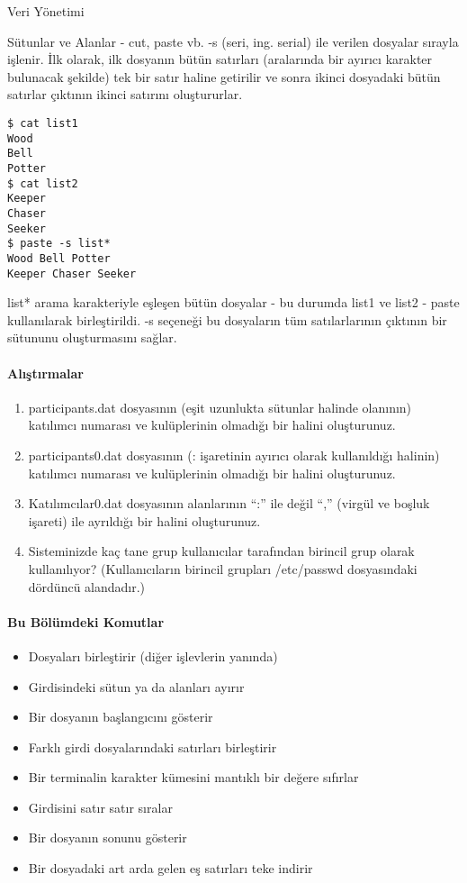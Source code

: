 \begin{section}{Veri Yönetimi}
\begin{subsection}{Sütunlar ve Alanlar - cut, paste vb.}
-s (seri, ing. serial) ile verilen dosyalar sırayla işlenir. İlk olarak, ilk dosyanın bütün satırları (aralarında bir ayırıcı karakter bulunacak şekilde) tek bir satır haline getirilir ve sonra ikinci dosyadaki bütün satırlar çıktının ikinci satırını oluştururlar.

\footnotesize
\begin{verbatim}
$ cat list1
Wood
Bell
Potter
$ cat list2
Keeper
Chaser
Seeker
$ paste -s list*
Wood Bell Potter
Keeper Chaser Seeker
\end{verbatim}
\normalsize

list* arama karakteriyle eşleşen bütün dosyalar - bu durumda list1 ve list2 - paste kullanılarak birleştirildi. -s seçeneği bu dosyaların tüm satılarlarının çıktının bir sütununu oluşturmasını sağlar.

\paragraph{{\Huge{\PencilLeftDown}}Alıştırmalar}{
\begin{enumerate}
 \item participants.dat dosyasının (eşit uzunlukta sütunlar halinde olanının) katılımcı numarası ve kulüplerinin olmadığı bir halini oluşturunuz.
 \item participants0.dat dosyasının (: işaretinin ayırıcı olarak kullanıldığı halinin) katılımcı numarası ve kulüplerinin olmadığı bir halini oluşturunuz.
 \item Katılımcılar0.dat dosyasının alanlarının “:” ile değil “,\textvisiblespace ” (virgül ve boşluk işareti) ile ayrıldığı bir halini oluşturunuz.
 \item Sisteminizde kaç tane grup kullanıcılar tarafından birincil grup olarak kullanılıyor? (Kullanıcıların birincil grupları /etc/passwd dosyasındaki dördüncü alandadır.)
\end{enumerate}}

\paragraph{Bu Bölümdeki Komutlar}{
\begin{itemize}
\item[cat]Dosyaları birleştirir (diğer işlevlerin yanında)
\item[cut]Girdisindeki sütun ya da alanları ayırır
\item[head]Bir dosyanın başlangıcını gösterir
\item[paste]Farklı girdi dosyalarındaki satırları birleştirir
\item[reset]Bir terminalin karakter kümesini mantıklı bir değere sıfırlar
\item[sort]Girdisini satır satır sıralar
\item[tail]Bir dosyanın sonunu gösterir
\item[uniq]Bir dosyadaki art arda gelen eş satırları teke indirir
\end{itemize}}


\end{subsection}
\end{section}
